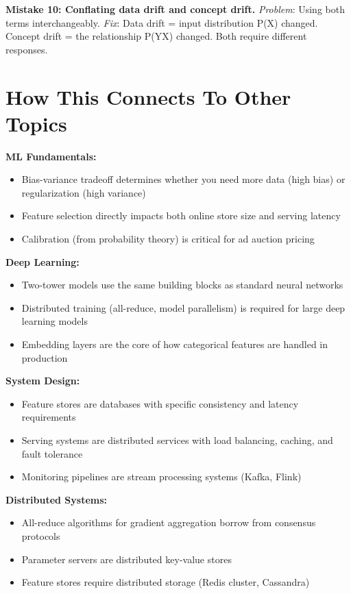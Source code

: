 \documentclass[11pt]{article}
\providecommand{\tightlist}{\setlength{\itemsep}{1pt}\setlength{\parskip}{0pt}}
\begin{document}
\textbf{Mistake 10: Conflating data drift and concept drift.}
\emph{Problem}: Using both terms interchangeably.
\emph{Fix}: Data drift = input distribution P(X) changed. Concept drift = the relationship P(Y\textbar X) changed. Both require different responses.

\section{How This Connects To Other Topics}\label{how-this-connects-to-other-topics}

\textbf{ML Fundamentals:}

\begin{itemize}
\tightlist
\item
  Bias-variance tradeoff determines whether you need more data (high bias) or regularization (high variance)
\item
  Feature selection directly impacts both online store size and serving latency
\item
  Calibration (from probability theory) is critical for ad auction pricing
\end{itemize}

\textbf{Deep Learning:}

\begin{itemize}
\tightlist
\item
  Two-tower models use the same building blocks as standard neural networks
\item
  Distributed training (all-reduce, model parallelism) is required for large deep learning models
\item
  Embedding layers are the core of how categorical features are handled in production
\end{itemize}

\textbf{System Design:}

\begin{itemize}
\tightlist
\item
  Feature stores are databases with specific consistency and latency requirements
\item
  Serving systems are distributed services with load balancing, caching, and fault tolerance
\item
  Monitoring pipelines are stream processing systems (Kafka, Flink)
\end{itemize}

\textbf{Distributed Systems:}

\begin{itemize}
\tightlist
\item
  All-reduce algorithms for gradient aggregation borrow from consensus protocols
\item
  Parameter servers are distributed key-value stores
\item
  Feature stores require distributed storage (Redis cluster, Cassandra)
\end{itemize}
\end{document}
